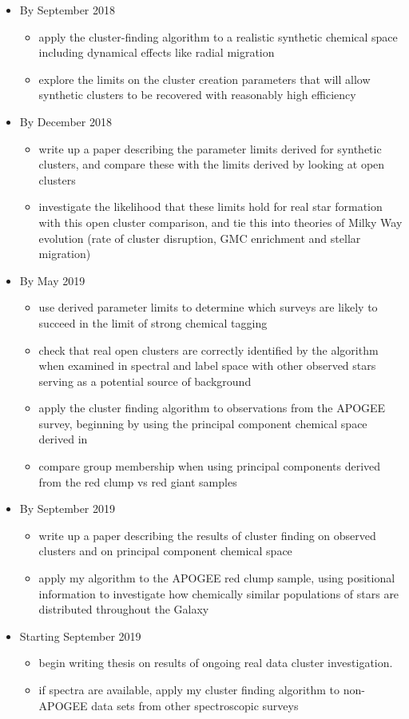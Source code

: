 \documentclass[11pt]{article}
\begin{document}
\begin{itemize}
\item By September 2018
\begin{itemize}
\item {\color{RoyalBlue}apply the cluster-finding algorithm to a realistic synthetic chemical space} {\color{Mulberry} including dynamical effects like radial migration}
\item {\color{ForestGreen} explore the limits on the cluster creation parameters that will allow synthetic clusters to be recovered with reasonably high efficiency}
\end{itemize}
\item By December 2018
\begin{itemize}
\item write up a paper describing the parameter limits derived for synthetic clusters, and compare these with the limits derived by looking at open clusters
\item investigate the likelihood that these limits hold for real star formation with this open cluster comparison, and tie this into theories of Milky Way evolution (rate of cluster disruption, GMC enrichment and stellar migration)
\end{itemize}
\item By May 2019
\begin{itemize}
\item use derived parameter limits to determine which surveys are likely to succeed in the limit of strong chemical tagging
\item check that real open clusters are correctly identified by the algorithm when examined in spectral and label space with other observed stars serving as a potential source of background
\item apply the cluster finding algorithm to observations from the APOGEE survey, beginning by using the principal component chemical space derived in \citet{Price-Jones2017}
\item compare group membership when using principal components derived from the red clump vs red giant samples
\end{itemize} 
\item By September 2019
\begin{itemize}
\item write up a paper describing the results of cluster finding on observed clusters and on principal component chemical space
\item apply my algorithm to the APOGEE red clump sample, using positional information to investigate how chemically similar populations of stars are distributed throughout the Galaxy
\end{itemize}
\item Starting September 2019
\begin{itemize}
\item begin writing thesis on results of ongoing real data cluster investigation.
\item if spectra are available, apply my cluster finding algorithm to non-APOGEE data sets from other spectroscopic surveys
\end{itemize}
\end{itemize}

%
\end{document}
